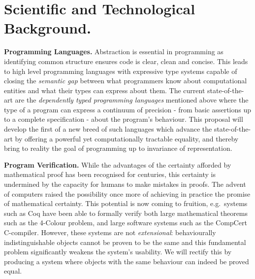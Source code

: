 \documentclass[a4paper,11pt]{article}
\newcommand{\eg}{{e.g.}\ }
\begin{document}

\vspace*{-0.1in} 
\section{Scientific and Technological Background.}
\vspace*{-0.1in} 

{\bf Programming Languages.} Abstraction is essential in programming
as identifying common structure ensures code is clear,
clean and concise. This leads to high level
programming languages with expressive type systems capable of closing
the {\em semantic gap} between what programmers know about
computational entities and what their types can express about them.
The current state-of-the-art are the {\em dependently typed
  programming languages} mentioned above where
the type of a program can express a
continuum of precision - from basic assertions up to a complete
specification - about the program's behaviour. This proposal will
develop the first of a new breed of 
such languages which advance the state-of-the-art by offering a
powerful yet computationally tractable equality, and thereby bring to
reality the goal of programming up to invariance of representation.


{\bf Program Verification.} While the advantages of the certainty
afforded by mathematical proof has been recognised for centuries, this
certainty is undermined by the capacity for humans to make mistakes in
proofs. The advent of computers raised the possibility once more of
achieving in practice the promise of mathematical certainty. This
potential is now coming to fruition, \eg systems such as Coq have been
able to formally verify both large mathematical theorems such as the
4-Colour problem, and large software systems such as the CompCert
C-compiler. However, these systems are not {\em extensional}:
behaviourally indistinguishable objects cannot be proven to be the
same and this fundamental problem significantly weakens the system's
usability. We will rectify this by producing a system where
objects with the same behaviour can indeed be proved equal.
\end{document}
